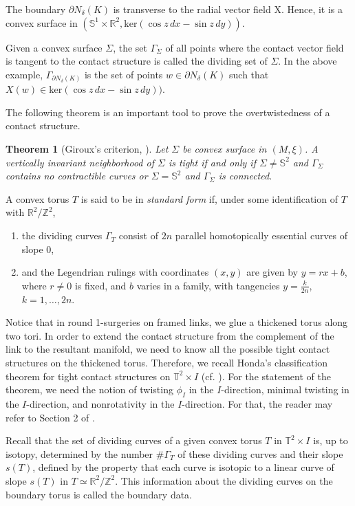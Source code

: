 \documentclass{amsart}
\theoremstyle{plain}
\newtheorem{thm}{Theorem}
\theoremstyle{remark}
\theoremstyle{definition}
\newcommand{\s}{\mathbb{S}}
\begin{document}
The boundary $\partial N_{\delta}(K)$ is transverse to the radial vector field X. Hence, it is a convex surface in $(\s^1 \times \mathbb{R}^2, \text{ker}(\cos z \,dx-\sin z\, dy))$. 

Given a convex surface $\Sigma$, the set $\Gamma_{\Sigma}$ of all points where the contact vector field is tangent to the contact structure is called the dividing set of $\Sigma$. In the above example, $\Gamma_{\partial N_{\delta}(K)}$ is the set of points $w \in \partial N_{\delta}(K)$ such that $X(w) \in \text{ker}(\cos z \,dx-\sin  z\, dy))$. 

The following theorem is an important tool to prove the overtwistedness of a contact structure. 

\begin{thm}[Giroux's criterion, \cite{Giroux-Convex91}]\label{thm: Giroux Criterion}
Let $\Sigma$ be convex surface in $(M, \xi)$. A vertically invariant neighborhood of $\Sigma$ is tight if and only if $\Sigma \neq \s^2$ and $\Gamma_{\Sigma}$ contains no contractible curves or $\Sigma = \s^2$ and $\Gamma_{\Sigma}$ is connected. 
\end{thm}


A convex torus $T$ is said to be in {\it standard form} if, under some identification of $T$ with $\mathbb{R}^2/\mathbb{Z}^2$, 
\begin{enumerate}
    \item the dividing curves $\Gamma_T$ consist of $2n$ parallel homotopically essential curves of slope 0, 
    \item and the Legendrian rulings with coordinates $(x,y)$ are given by $y=rx+b$, where $r\neq 0$ is fixed, and $b$ varies in a family, with tangencies $y=\frac{k}{2n}$, $k= 1, \ldots, 2n$.  
\end{enumerate}


Notice that in round 1-surgeries on framed links, we glue a thickened torus along two tori. 
In order to extend the contact structure from the complement of the link to the resultant manifold, we need to know all the possible tight contact structures on the thickened torus.      
Therefore, we recall Honda's classification theorem for tight contact structures on $\mathbb{T}^2\times I$ (cf. \cite{KH}).
For the statement of the theorem, we need the notion of twisting $\phi_I$ in the $I$-direction, minimal twisting in the $I$-direction, and nonrotativity in the $I$-direction. For that, the reader may refer to Section 2 of \cite{KH}. 

Recall that the set of dividing curves of a given convex torus $T$ in $\mathbb{T}^2 \times I$ is, up to isotopy, determined by the number $\# \Gamma_T$ of these dividing curves and their slope $s(T)$, defined by the property that each curve is isotopic to a linear curve of slope $s(T)$ in $T \simeq \mathbb{R}^2 / \mathbb{Z}^2$. This information about the dividing curves on the boundary torus is called the boundary data. 
\end{document}
